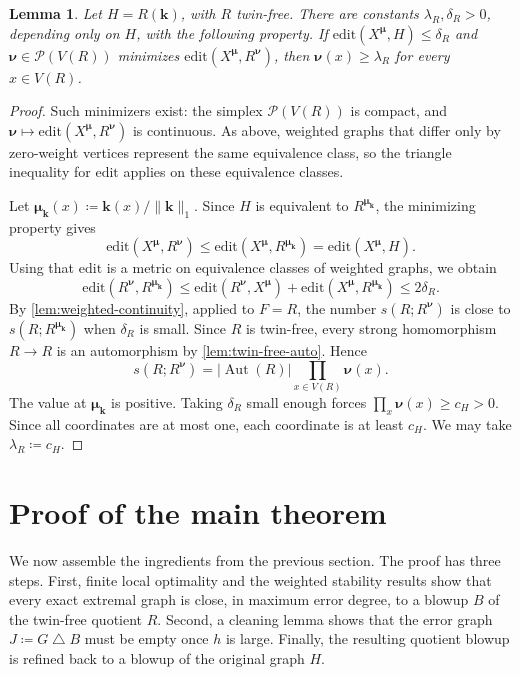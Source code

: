 \documentclass[10pt]{article}
\theoremstyle{plain}
\newtheorem{lemma}[lemma]{Lemma}
\theoremstyle{remark}
\DeclareMathOperator{\Aut}{Aut}
\newcommand{\symdiff}{\mathbin{\triangle}}
\newcommand{\bmu}{{\boldsymbol{\mu}}}
\newcommand{\bnu}{{\boldsymbol{\nu}}}
\begin{document}
\begin{lemma}
\label{lem:boundary}
Let $H=R(\mathbf k)$, with $R$ twin-free. There are constants $\lambda_R,\delta_R>0$, depending only on $H$, with the following property. If $\mathrm{edit}(X^\bmu,H)\le\delta_R$ and $\bnu\in\mathcal P(V(R))$ minimizes $\mathrm{edit}(X^\bmu,R^\bnu)$, then $\bnu(x)\ge\lambda_R$ for every $x\in V(R)$.
\end{lemma}

\begin{proof}
Such minimizers exist: the simplex $\mathcal P(V(R))$ is compact, and $\bnu\mapsto\mathrm{edit}(X^\bmu,R^\bnu)$ is continuous. As above, weighted graphs that differ only by zero-weight vertices represent the same equivalence class, so the triangle inequality for $\mathrm{edit}$ applies on these equivalence classes.

Let $\bmu_{\mathbf k}(x)\coloneqq\mathbf k(x)/\|\mathbf k\|_1$. Since $H$ is equivalent to $R^{\bmu_{\mathbf k}}$, the minimizing property gives
\[
        \mathrm{edit}(X^\bmu,R^\bnu)\le \mathrm{edit}(X^\bmu,R^{\bmu_{\mathbf k}})=\mathrm{edit}(X^\bmu,H).
\]
Using that $\mathrm{edit}$ is a metric on equivalence classes of weighted graphs, we obtain
\[
        \mathrm{edit}(R^\bnu,R^{\bmu_{\mathbf k}})
        \le \mathrm{edit}(R^\bnu,X^\bmu)+\mathrm{edit}(X^\bmu,R^{\bmu_{\mathbf k}})
        \le 2\delta_R.
\]
By \cref{lem:weighted-continuity}, applied to $F=R$, the number $s(R;R^\bnu)$ is close to $s(R;R^{\bmu_{\mathbf k}})$ when $\delta_R$ is small. Since $R$ is twin-free, every strong homomorphism $R\to R$ is an automorphism by \cref{lem:twin-free-auto}. Hence
\[
        s(R;R^\bnu)=|\Aut(R)|\prod_{x\in V(R)}\bnu(x).
\]
The value at $\bmu_{\mathbf k}$ is positive. Taking $\delta_R$ small enough forces $\prod_x\bnu(x)\ge c_H>0$. Since all coordinates are at most one, each coordinate is at least $c_H$. We may take $\lambda_R\coloneqq c_H$.
\end{proof}

\section{Proof of the main theorem}
\label{sec:proof}

We now assemble the ingredients from the previous section. The proof has three steps. First, finite local optimality and the weighted stability results show that every exact extremal graph is close, in maximum error degree, to a blowup $B$ of the twin-free quotient $R$. Second, a cleaning lemma shows that the error graph $J\coloneqq G\symdiff B$ must be empty once $h$ is large. Finally, the resulting quotient blowup is refined back to a blowup of the original graph $H$.
\end{document}
